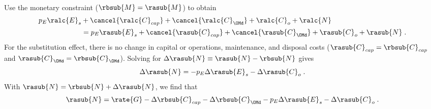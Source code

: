 \begin{landscape}
{}
{
~
  
Use the monetary constraint ($\rbsub{M} = \rasub{M}$) to obtain
%
\begin{align}
  p_E \ralc{E}_s &+ \cancel{\ralc{C}_{cap}} + \cancel{\ralc{C}_{\OMd}} + \ralc{C}_o + \ralc{N} \nonumber \\
                 &= p_E \rasub{E}_s + \cancel{\rasub{C}_{cap}} + \cancel{\rasub{C}_{\OMd}} + \rasub{C}_o + \rasub{N} \; .
\end{align}
%
For the substitution effect, there is no change in capital or operations, maintenance, and disposal costs
($\rasub{C}_{cap} = \rbsub{C}_{cap}$ and $\rasub{C}_{\OMd} = \rbsub{C}_{\OMd}$).
Solving for $\Delta \rasub{N} \equiv \rasub{N} - \rbsub{N}$ gives
%
\begin{equation}
  \Delta \rasub{N} = - p_E \Delta \rasub{E}_s - \Delta \rasub{C}_o \; .
\end{equation}
%
With $\rasub{N} = \rbsub{N} + \Delta \rasub{N}$, 
we find that
%
\begin{equation}
  \rasub{N} = \rate{G} - \Delta \rbsub{C}_{cap} - \Delta \rbsub{C}_{\OMd} - p_E \Delta \rasub{E}_s - \Delta \rasub{C}_o \; .
\end{equation}
%
}

\end{landscape}